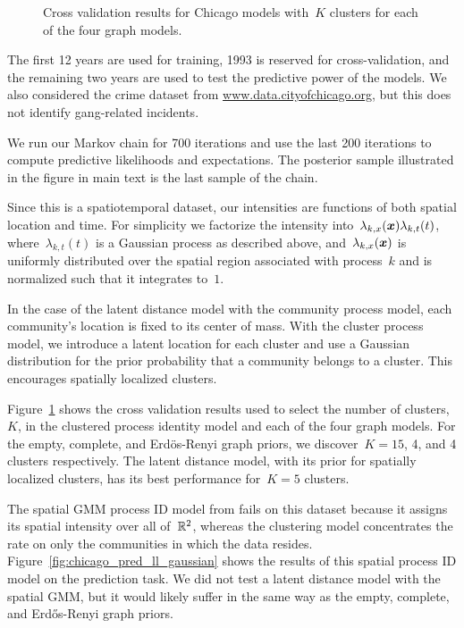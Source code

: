 \begin{figure}[!t]
\begin{subfigure}[T]{.24\linewidth}
\begin{center}
    \end{center}
  \end{subfigure}
  \caption[Cross validation results for Gangs of Chicago models]{Cross
    validation results for Chicago models with~$K$ clusters for each
    of the four graph models.}
  \label{fig:chicago_xv}
\end{figure}

The first 12 years are used for training, 1993 is reserved for
cross-validation, and the remaining two years are used to test the
predictive power of the models. We also considered the crime dataset
from \url{www.data.cityofchicago.org}, but this does not identify
gang-related incidents.

We run our Markov chain for 700 iterations and use the last 200
iterations to compute predictive likelihoods and expectations. The
posterior sample illustrated in the figure in main text is the last
sample of the chain.

Since this is a spatiotemporal dataset, our intensities are functions
of both spatial location and time. For simplicity we factorize the
intensity into~${\lambda_{k,x}(\boldsymbol{x})\lambda_{k,t}(t)}$,
where~${\lambda_{k,t}(t)}$ is a Gaussian process as described above,
and~${\lambda_{k,x}(\boldsymbol{x})}$ is uniformly distributed over the spatial
region associated with process~$k$ and is normalized such that it
integrates to~$1$.

In the case of the latent distance model with the community process
model, each community's location is fixed to its center of mass. With
the cluster process model, we introduce a latent location for each
cluster and use a Gaussian distribution for the prior probability that
a community belongs to a cluster. This encourages spatially localized
clusters.

Figure~\ref{fig:chicago_xv} shows the cross validation results used to
select the number of clusters,~$K$, in the clustered process identity
model and each of the four graph models. For the empty, complete, and
Erd\"os-Renyi graph priors, we discover~${K=15}$, 4, and 4 clusters
respectively. The latent distance model, with its prior for spatially
localized clusters, has its best performance for~${K=5}$ clusters.

The spatial GMM process ID model from \citet{Cho-2013} fails on this
dataset because it assigns its spatial intensity over all
of~$\mathbb{R}^2$, whereas the clustering model concentrates the rate on
only the communities in which the data
resides. Figure~\ref{fig:chicago_pred_ll_gaussian} shows the results
of this spatial process ID model on the prediction task. We did not
test a latent distance model with the spatial GMM, but it would likely
suffer in the same way as the empty, complete, and Erd\H{o}s-Renyi
graph priors.
 

